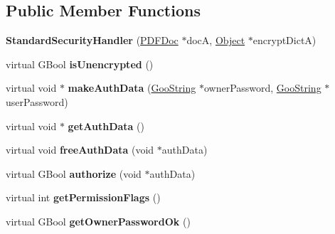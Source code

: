 \subsection*{Public Member Functions}
\begin{DoxyCompactItemize}
\item 
\mbox{\label{class_standard_security_handler_a49763505c683abab64e533b0013f2ea3}} 
{\bfseries Standard\+Security\+Handler} (\hyperlink{class_p_d_f_doc}{P\+D\+F\+Doc} $\ast$docA, \hyperlink{class_object}{Object} $\ast$encrypt\+DictA)
\item 
\mbox{\label{class_standard_security_handler_a253d5076d2bdbe9d0bea2a461e78acc5}} 
virtual G\+Bool {\bfseries is\+Unencrypted} ()
\item 
\mbox{\label{class_standard_security_handler_a00eeb594b8a82612191b0e61b9386901}} 
virtual void $\ast$ {\bfseries make\+Auth\+Data} (\hyperlink{class_goo_string}{Goo\+String} $\ast$owner\+Password, \hyperlink{class_goo_string}{Goo\+String} $\ast$user\+Password)
\item 
\mbox{\label{class_standard_security_handler_ae7e116d3633ecd7eda7000bcffce09a1}} 
virtual void $\ast$ {\bfseries get\+Auth\+Data} ()
\item 
\mbox{\label{class_standard_security_handler_add7f52d31a508213f311d4bda246a8ac}} 
virtual void {\bfseries free\+Auth\+Data} (void $\ast$auth\+Data)
\item 
\mbox{\label{class_standard_security_handler_a40a02060fe27952443b5a165b62c97be}} 
virtual G\+Bool {\bfseries authorize} (void $\ast$auth\+Data)
\item 
\mbox{\label{class_standard_security_handler_adf966f9096736aeb272d44629c9c3c0c}} 
virtual int {\bfseries get\+Permission\+Flags} ()
\item 
\mbox{\label{class_standard_security_handler_ac2612c6661fd083e33a838c8fb106b6e}} 
virtual G\+Bool {\bfseries get\+Owner\+Password\+Ok} ()
\item 

\end{DoxyCompactItemize}
